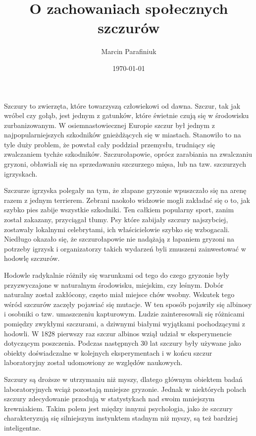 \documentclass{psychol}
\title{O zachowaniach społecznych szczurów}
\author{Marcin Parafiniuk}
\date{\today}
\begin{document}
\maketitle
\tableofcontents
\doublespacing

\pagebreak


Szczury to zwierzęta, które towarzyszą człowiekowi od dawna. Szczur, tak jak wróbel czy gołąb, jest jednym z gatunków, które świetnie czują się w środowisku zurbanizowanym. W osiemnastowiecznej Europie szczur był jednym z najpopularniejszych szkodników gnieżdżących się w miastach. Stanowiło to na tyle duży problem, że powstał cały poddział przemysłu, trudniący się zwalczaniem tychże szkodników. Szczurołapowie, oprócz zarabiania na zwalczaniu gryzoni, obławiali się na sprzedawaniu szczurzego mięsa, lub na tzw. szczurzych igrzyskach.

Szczurze igrzyska polegały na tym, że złapane gryzonie wpuszczało się na arenę razem z jednym terrierem. Zebrani naokoło widzowie mogli zakładać się o to, jak szybko pies zabije wszystkie szkodniki. Ten całkiem popularny sport, zanim został zakazany, przyciągał tłumy. Psy które zabijały szczury najszybciej, zostawały lokalnymi celebrytami, ich właścicielowie szybko się wzbogacali. Niedługo okazało się, że szczurołapowie nie nadążają z łapaniem gryzoni na potrzeby igrzysk i organizatorzy takich wydarzeń byli zmuszeni zainwestować w hodowlę szczurów.

Hodowle radykalnie różniły się warunkami od tego do czego gryzonie były przyzwyczajone w naturalnym środowisku, miejskim, czy leśnym. Dobór naturalny został zakłócony, często miał miejsce chów wsobny. Wskutek tego wśród szczurów zaczęły pojawiać się mutacje. W ten sposób pojawiły się albinosy i osobniki o tzw. umaszczeniu kapturowym. Ludzie zainteresowali się różnicami pomiędzy zwykłymi szczurami, a dziwnymi białymi wyjątkami pochodzącymi z hodowli. W 1828 pierwszy raz szczur albinos wziął udział w eksperymencie dotyczącym poszczenia. Podczas następnych 30 lat szczury były używane jako obiekty doświadczalne w kolejnych eksperymentach i w końcu szczur laboratoryjny został udomowiony ze względów naukowych.

Szczury są droższe w utrzymaniu niż myszy, dlatego głównym obiektem badań laboratoryjnych wciąż pozostają mniejsze gryzonie. Jednak w niektórych polach szczury zdecydowanie przodują w statystykach nad swoim mniejszym krewniakiem. Takim polem jest między innymi psychologia, jako że szczury charakteryzują się silniejszym instynktem stadnym niż myszy, są też bardziej inteligentne.
\end{document}
